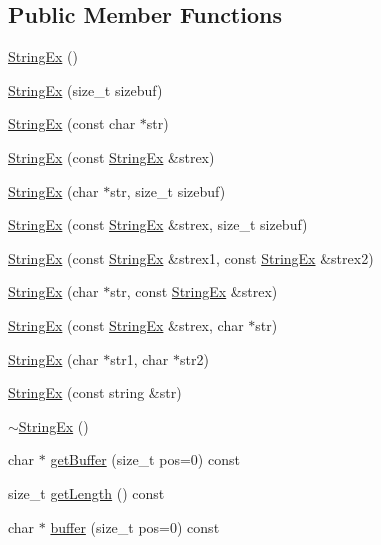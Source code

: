 \subsection*{Public Member Functions}
\begin{CompactItemize}
\item 
\hyperlink{classStringEx_682cb42c740bb422cc430533b57a92cf}{StringEx} ()
\item 
\hyperlink{classStringEx_949af3bd05202d94d9550fc5da749aba}{StringEx} (size\_\-t sizebuf)
\item 
\hyperlink{classStringEx_ae67472656d518a9146209d12494cb1b}{StringEx} (const char $\ast$str)
\item 
\hyperlink{classStringEx_93e2a37d36fe9104558e448924fcb57d}{StringEx} (const \hyperlink{classStringEx}{StringEx} \&strex)
\item 
\hyperlink{classStringEx_4f8c7c39cf9bdb89b0de4a23054bfa1d}{StringEx} (char $\ast$str, size\_\-t sizebuf)
\item 
\hyperlink{classStringEx_7647d27a1a03f22a23a7f3d863cf939b}{StringEx} (const \hyperlink{classStringEx}{StringEx} \&strex, size\_\-t sizebuf)
\item 
\hyperlink{classStringEx_61301e17f26551eba75f9f005544fc0f}{StringEx} (const \hyperlink{classStringEx}{StringEx} \&strex1, const \hyperlink{classStringEx}{StringEx} \&strex2)
\item 
\hyperlink{classStringEx_fb83e36bbf4afa26fc531e2c9fefa0f7}{StringEx} (char $\ast$str, const \hyperlink{classStringEx}{StringEx} \&strex)
\item 
\hyperlink{classStringEx_5304827ec0bfe2e225031653a82256c2}{StringEx} (const \hyperlink{classStringEx}{StringEx} \&strex, char $\ast$str)
\item 
\hyperlink{classStringEx_c34d876aa1b6fa515deadeea548b6806}{StringEx} (char $\ast$str1, char $\ast$str2)
\item 
\hyperlink{classStringEx_c9a8ce33aa75cfb5fd0db69a66a074a4}{StringEx} (const string \&str)
\item 
\hyperlink{classStringEx_c8ae8071f10ebdec5dcd0991990bad55}{$\sim$StringEx} ()
\item 
char $\ast$ \hyperlink{classStringEx_9260ba2f0b6e36257f85037a61f6cc30}{getBuffer} (size\_\-t pos=0) const 
\item 
size\_\-t \hyperlink{classStringEx_ca8d43a55788bf20513aa829a75af7f9}{getLength} () const 
\item 
char $\ast$ \hyperlink{classStringEx_2b4c36bb82f085f585dd80f014aed462}{buffer} (size\_\-t pos=0) const 

\end{CompactItemize}
